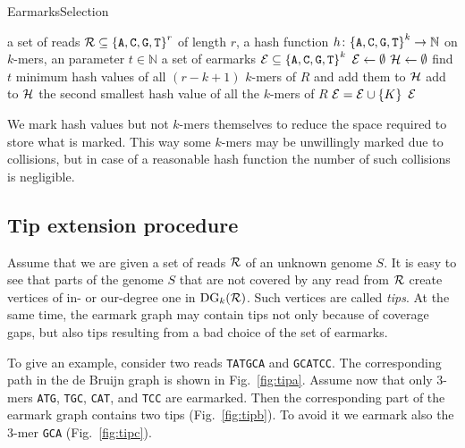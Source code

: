 \documentclass[12pt]{article}
\def\acgt{\{{\tt A,C,G,T}\}}
\begin{document}
\begin{algorithm}
\caption{EarmarksSelection}
\label{alg:earmarksselection}
\begin{algorithmic}%
  \REQUIRE a set of reads ${\cal R} \subseteq {\acgt}^r$ of length $r$, 
    a hash function $h \colon {\acgt}^k \rightarrow \mathbb{N}$ on $k$-mers, 
    an parameter $t \in \mathbb{N}$
  \ENSURE a set of earmarks ${\cal E} \subseteq {\acgt}^k$
  \STATE ${\cal E} \gets \emptyset$ 
  \STATE ${\cal H} \gets \emptyset$ 
    \STATE find $t$ minimum hash values of all $(r-k+1)$ $k$-mers of $R$ and 
    add them to ${\cal H}$
  \ENDFOR
      \STATE add to ${\cal H}$ the second smallest hash value of all the 
      $k$-mers of $R$
    \ENDFOR
  \ENDIF
        \STATE ${\cal E} = {\cal E} \cup \{K\}$
      \ENDIF
    \ENDFOR
  \ENDFOR
  \RETURN ${\cal E}$
\end{algorithmic}
\end{algorithm}

We mark hash values but not $k$-mers themselves to reduce the space 
required to store what is marked. This way some $k$-mers may be unwillingly marked due 
to collisions, but in case of a reasonable hash function the number of 
such collisions is negligible.


\subsection{Tip extension procedure}
Assume that we are given a set of reads ${\cal R}$ of an unknown genome $S$.
It is easy to see that parts of the genome $S$ that are not covered by any read
from ${\cal R}$ create vertices of in- or our-degree one in $\textrm{DG}_k({\cal R})$.
Such vertices are called \emph{tips}. At the same time, the earmark graph may contain
tips not only because of coverage gaps, but also tips resulting from a bad choice of the 
set of earmarks. 

To give an example,
consider two reads {\tt TATGCA} and {\tt GCATCC}.
The corresponding path in the de Bruijn graph is shown in 
Fig.~\ref{fig:tipa}. Assume now that only $3$-mers
{\tt ATG}, {\tt TGC}, {\tt CAT}, and {\tt TCC} are earmarked.
Then the corresponding part of the earmark graph contains two tips 
(Fig.~\ref{fig:tipb}). To avoid it we earmark also the $3$-mer
{\tt GCA} (Fig.~\ref{fig:tipc}).
\end{document}

